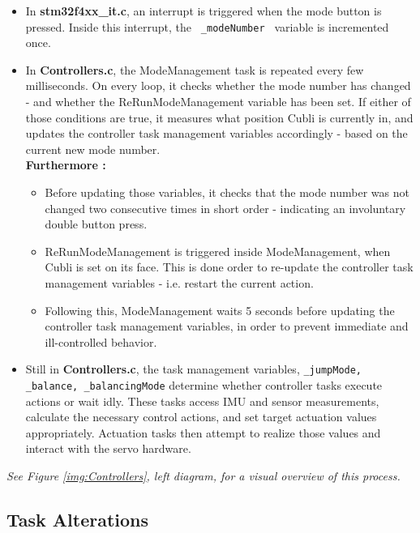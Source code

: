 \begin{itemize}
\item In \textbf{stm32f4xx\_it.c}, an interrupt is triggered when the mode button is pressed. Inside this interrupt, the \texttt{ \_modeNumber } variable is incremented once.

\item In \textbf{Controllers.c}, the ModeManagement task is repeated every few milliseconds. On every loop, it checks whether the mode number has changed - and whether the ReRunModeManagement variable has been set. If either of those conditions are true, it measures what position Cubli is currently in, and updates the controller task management variables accordingly - based on the current new mode number.\\

\textbf{Furthermore :} 
\begin{itemize}
\item[] Before updating those variables, it checks that the mode number was not changed two consecutive times in short order - indicating an involuntary double button press.
\item[] ReRunModeManagement is triggered inside ModeManagement, when Cubli is set on its face. This is done order to re-update the controller task management variables - i.e. restart the current action. 
\item[] Following this, ModeManagement waits 5 seconds before updating the controller task management variables, in order to prevent immediate and ill-controlled behavior.
\end{itemize}

\item Still in \textbf{Controllers.c}, the task management variables, \texttt{\_jumpMode, \_balance, \_balancingMode} determine whether controller tasks execute actions or wait idly. These tasks access IMU and sensor measurements, calculate the necessary control actions, and set target actuation values appropriately. Actuation tasks then attempt to realize those values and interact with the servo hardware.
\end{itemize}

\textit{See Figure \ref{img:Controllers}, left diagram, for a visual overview of this process.}


\subsection{Task Alterations}

